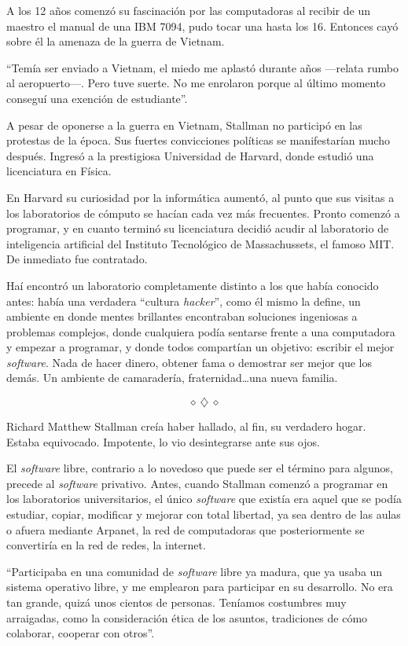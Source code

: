 \documentclass[oneside,twocolumn]{article}
\begin{document}
A los 12 años comenzó su fascinación por las computadoras al recibir de un maestro el manual 
de una IBM 7094, pudo tocar una hasta los 16. Entonces cayó sobre él la amenaza de la guerra de Vietnam.

``Temía ser enviado a Vietnam, el miedo me aplastó durante años ---relata rumbo al aeropuerto---. 
Pero tuve suerte. No me enrolaron porque al último momento conseguí una exención de estudiante''.
	
A pesar de oponerse a la guerra en Vietnam, Stallman no participó en las protestas de la época. 
Sus fuertes convicciones políticas se manifestarían mucho después. Ingresó a la prestigiosa Universidad 
de Harvard, donde estudió una licenciatura en Física.

En Harvard su curiosidad por la informática aumentó, al punto que sus visitas a los laboratorios 
de cómputo se hacían cada vez más frecuentes. Pronto comenzó a programar, y en cuanto terminó su 
licenciatura decidió acudir al laboratorio de inteligencia artificial del Instituto Tecnológico de 
Massachussets, el famoso MIT. De inmediato fue contratado.

Haí encontró un laboratorio completamente distinto a los que había conocido antes: había una 
verdadera ``cultura \emph{hacker}'', como él mismo la define, un ambiente en donde mentes brillantes
encontraban soluciones ingeniosas a problemas complejos, donde cualquiera podía sentarse frente a una 
computadora y empezar a programar, y donde todos compartían un objetivo: escribir el mejor \emph{software}.
Nada de hacer dinero, obtener fama o demostrar ser mejor que los demás. Un ambiente de camaradería, 
fraternidad\ldots una nueva familia.

\[\diamond~\diamondsuit~\diamond\]

Richard Matthew Stallman creía haber hallado, al fin, su verdadero hogar. Estaba equivocado. 
Impotente, lo vio desintegrarse ante sus ojos. 

El \emph{software} libre, contrario a lo novedoso que puede ser el término para algunos, precede 
al \emph{software} privativo. Antes, cuando Stallman comenzó a programar en los laboratorios universitarios, 
el único \emph{software} que existía era aquel que se podía estudiar, copiar, modificar y mejorar 
con total libertad, ya sea dentro de las aulas o afuera mediante Arpanet, la red de computadoras que
posteriormente se convertiría en la red de redes, la internet.

``Participaba en una comunidad de \emph{software} libre ya madura, que ya usaba un sistema operativo 
libre, y me emplearon para participar en su desarrollo. No era tan grande, quizá unos cientos de personas. 
Teníamos costumbres muy arraigadas, como la consideración ética de los asuntos, tradiciones de cómo 
colaborar, cooperar con otros''.
\end{document}
